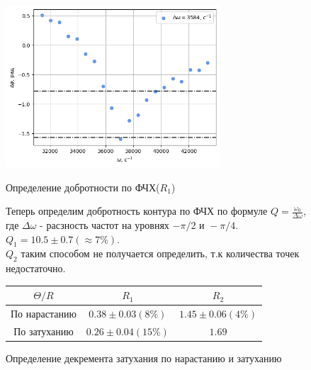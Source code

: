 \begin{figure}[h!]
\begin{minipage}{0.45\linewidth}
    \centering
    \includegraphics[width=8cm]{images/plot6.png}
    \caption{Определение добротности по ФЧХ($R_1$)}
\end{minipage}
\hfill
\begin{minipage}{0.49\linewidth}
{
Теперь определим добротность контура по ФЧХ по формуле $Q = \frac{\omega_0}{\Delta\omega}$, где 
$\Delta\omega$ - расзность частот на уровнях $-\pi/2 \text{ и }-\pi/4$. \\
$Q_1 = 10.5 \pm 0.7 (\approx 7\%)$.\\
\indent $Q_2$ таким способом не получается определить, т.к количества точек недостаточно.\\
}


    \centering
    \begin{tabular}{|c|c|c|}
            \hline
            $\Theta\text{/}R$ & $R_1$ & $R_2$ \\\hline
            По нарастанию & $0.38 \pm 0.03 (8\%)$ & $1.45 \pm 0.06 (4\%)$\\\hline
            По затуханию & $0.26 \pm 0.04 (15\%)$ & $1.69$\\\hline
    \end{tabular}
    \caption{Определение декремента затухания по нарастанию и затуханию}
\end{minipage}
\end{figure}
%

